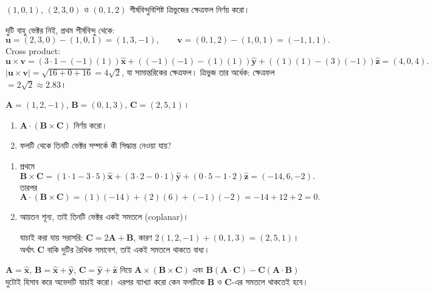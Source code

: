 \documentclass[11pt]{article}
\begin{document}
 $(1,0,1)$, $(2,3,0)$ ও $(0,1,2)$ শীর্ষবিন্দুবিশিষ্ট ত্রিভুজের
ক্ষেত্রফল নির্ণয় করো।

\begin{sol}
দুটি বাহু ভেক্টর নিই, প্রথম শীর্ষবিন্দু থেকে:
\[
  \mathbf{u} = (2,3,0)-(1,0,1) = (1,3,-1), \qquad
  \mathbf{v} = (0,1,2)-(1,0,1) = (-1,1,1) .
\]
Cross product:
\[
  \mathbf{u}\times\mathbf{v}
  = \left( 3\cdot 1 - (-1)(1) \right)\hat{\mathbf{x}}
  + \left( (-1)(-1) - (1)(1) \right)\hat{\mathbf{y}}
  + \left( (1)(1) - (3)(-1) \right)\hat{\mathbf{z}}
  = (4, 0, 4) .
\]
$|\mathbf{u}\times\mathbf{v}| = \sqrt{16+0+16} = 4\sqrt{2}$, যা সামান্তরিকের
ক্ষেত্রফল। ত্রিভুজ তার অর্ধেক:
ক্ষেত্রফল $= 2\sqrt{2} \approx 2.83$।
\end{sol}

 $\mathbf{A} = (1,2,-1)$, $\mathbf{B} = (0,1,3)$,
$\mathbf{C} = (2,5,1)$।
\begin{enumerate}
  \item $\mathbf{A}\cdot\left( \mathbf{B}\times\mathbf{C} \right)$ নির্ণয়
        করো।
  \item ফলটি থেকে তিনটি ভেক্টর সম্পর্কে কী সিদ্ধান্ত নেওয়া যায়?
\end{enumerate}

\begin{sol}
\begin{enumerate}
  \item প্রথমে
        \[
          \mathbf{B}\times\mathbf{C}
          = \left( 1\cdot 1 - 3\cdot 5 \right)\hat{\mathbf{x}}
          + \left( 3\cdot 2 - 0\cdot 1 \right)\hat{\mathbf{y}}
          + \left( 0\cdot 5 - 1\cdot 2 \right)\hat{\mathbf{z}}
          = (-14, 6, -2) .
        \]
        তারপর
        \[
          \mathbf{A}\cdot\left( \mathbf{B}\times\mathbf{C} \right)
          = (1)(-14) + (2)(6) + (-1)(-2) = -14 + 12 + 2 = 0 .
        \]
  \item আয়তন শূন্য, তাই তিনটি ভেক্টর একই সমতলে (coplanar)।

        যাচাই করা যায় সরাসরি: $\mathbf{C} = 2\mathbf{A} + \mathbf{B}$, কারণ
        $2(1,2,-1) + (0,1,3) = (2,5,1)$। অর্থাৎ $\mathbf{C}$ বাকি দুটির
        রৈখিক সমাবেশ, তাই একই সমতলে থাকতে বাধ্য।
\end{enumerate}
\end{sol}

 $\mathbf{A} = \hat{\mathbf{x}}$,
$\mathbf{B} = \hat{\mathbf{x}}+\hat{\mathbf{y}}$,
$\mathbf{C} = \hat{\mathbf{y}}+\hat{\mathbf{z}}$ নিয়ে
$\mathbf{A}\times\left( \mathbf{B}\times\mathbf{C} \right)$ এবং
$\mathbf{B}\left( \mathbf{A}\cdot\mathbf{C} \right)
- \mathbf{C}\left( \mathbf{A}\cdot\mathbf{B} \right)$ দুটোই হিসাব করে
অভেদটি যাচাই করো। এরপর ব্যাখ্যা করো কেন ফলটিকে $\mathbf{B}$ ও $\mathbf{C}$-এর
সমতলে থাকতেই হবে।
\end{document}
